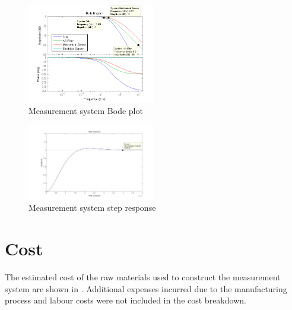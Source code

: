 \documentclass[10pt,twocolumn]{witseiepaper}
\begin{document}
\begin{figure}[h!]
	\centering
	\includegraphics[width=0.5\textwidth]{bode}
	\caption{Measurement system Bode plot}
	\label{fig:bode}
\end{figure}

\begin{figure}[h!]
	\centering
	\includegraphics[width=0.5\textwidth]{filterStep}
	\caption{Measurement system step response}
	\label{fig:step}
\end{figure}

\section{Cost}

The estimated cost of the raw materials used to construct the measurement system are shown in . Additional expenses incurred due to the manufacturing process and labour costs were not included in the cost breakdown.
\end{document}
